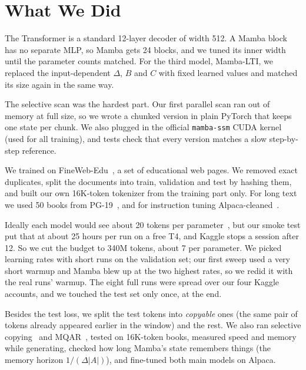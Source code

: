 \documentclass[conference]{IEEEtran}
\begin{document}
\section{What We Did}
The Transformer is a standard 12-layer decoder of width 512. A Mamba block has no separate MLP, so Mamba
gets 24 blocks, and we tuned its inner width until the parameter counts matched. For the third model,
Mamba-LTI, we replaced the input-dependent $\Delta$, $B$ and $C$ with fixed learned values and matched its
size again in the same way.

The selective scan was the hardest part. Our first parallel scan ran out of memory at full size, so we wrote
a chunked version in plain PyTorch that keeps one state per chunk. We also plugged in the official
\texttt{mamba-ssm} CUDA kernel (used for all training), and tests check that every version matches a slow
step-by-step reference.

We trained on FineWeb-Edu~\cite{penedo2024fineweb}, a set of educational web pages. We removed exact
duplicates, split the documents into train, validation and test by hashing them, and built our own
16K-token tokenizer from the training part only. For long text we used 50 books from PG-19~\cite{rae2020compressive},
and for instruction tuning Alpaca-cleaned~\cite{taori2023alpaca}.

Ideally each model would see about 20 tokens per parameter~\cite{hoffmann2022chinchilla}, but our smoke test
put that at about 25 hours per run on a free T4, and Kaggle stops a session after 12. So we cut the budget to
340M tokens, about 7 per parameter. We picked learning rates with short runs on the validation set; our
first sweep used a very short warmup and Mamba blew up at the two highest rates, so we redid it with the
real runs' warmup. The eight full runs were spread over our four Kaggle accounts, and we touched the test
set only once, at the end.

Besides the test loss, we split the test tokens into \emph{copyable} ones (the same pair of tokens already
appeared earlier in the window) and the rest. We also ran selective copying~\cite{gu2023mamba} and
MQAR~\cite{arora2023zoology}, tested on 16K-token books, measured speed and memory while generating,
checked how long Mamba's state remembers things (the memory horizon $1/(\Delta|A|)$), and fine-tuned both
main models on Alpaca.
\end{document}
